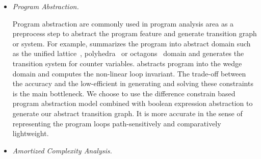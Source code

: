 \begin{itemize}
\item \emph{Program Abstraction.}

Program abstraction are commonly used in program analysis area as a preprocess step to abstract the program feature and generate transition graph or system. For example, \cite{GulwaniZ10} summarizes the program into abstract domain such as the unified lattice~\cite{CousotH78}, polyhedra~\cite{CousotC77} or octagons~\cite{Mine06} domain and generates the transition system for counter variables.
\cite{KincaidCBR18} abstracts program into the wedge domain and computes the non-linear loop invariant.
The trade-off between the accuracy and the low-efficient in generating and solving these constraints is the main bottleneck.
We choose to use the difference constrain based~\cite{SinnZV17,SinnZV14} program abstraction model combined with boolean expression abstraction to generate our abstract transition graph.
It is more accurate in the sense of representing the program loops path-sensitively and comparatively lightweight.

\item \emph{Amortized Complexity Analysis.}


\end{itemize}
